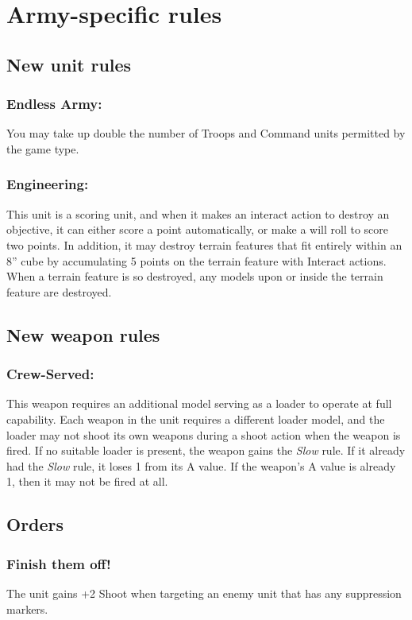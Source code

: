 \section*{Army-specific rules}

\subsection*{New unit rules}

\subsubsection*{Endless Army:} You may take up double the number of Troops and Command units permitted by the game type.

\subsubsection*{Engineering:} This unit is a scoring unit, and when it makes an interact action to destroy an objective, it can either score a point automatically, or make a will roll to score two points. In addition, it may destroy terrain features that fit entirely within an 8'' cube by accumulating 5 points on the terrain feature with Interact actions. When a terrain feature is so destroyed, any models upon or inside the terrain feature are destroyed.

\subsection*{New weapon rules}

\subsubsection*{Crew-Served:} This weapon requires an additional model serving as a loader to operate at full capability. Each weapon in the unit requires a different loader model, and the loader may not shoot its own weapons during a shoot action when the weapon is fired. If no suitable loader is present, the weapon gains the \textit{Slow} rule. If it already had the \textit{Slow} rule, it loses 1 from its A value. If the weapon's A value is already 1, then it may not be fired at all.

\subsection*{Orders}

\subsubsection*{Finish them off!} The unit gains +2 Shoot when targeting an enemy unit that has any suppression markers.

